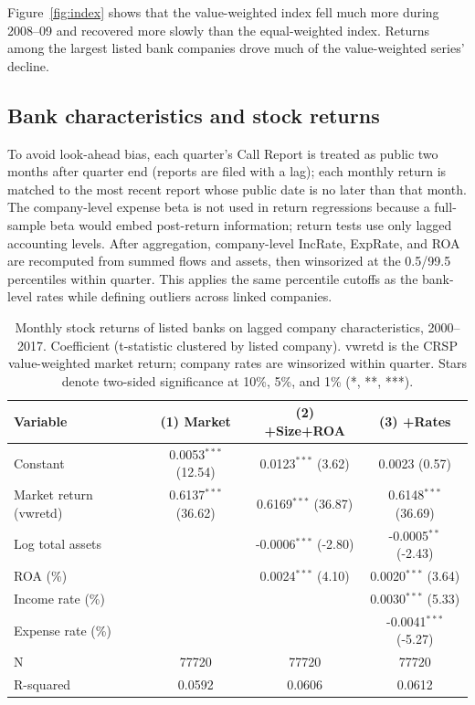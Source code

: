 \documentclass[11pt]{article}
\begin{document}
Figure~\ref{fig:index} shows that the value-weighted index fell much more
during 2008--09 and recovered more slowly than the equal-weighted index.
Returns among the largest listed bank companies drove much of the
value-weighted series' decline.

\subsection{Bank characteristics and stock returns}
To avoid look-ahead bias, each quarter's Call Report is treated as public two
months after quarter end (reports are filed with a lag); each monthly return
is matched to the most recent report whose public date is no later than that
month. The company-level expense beta is not used in return regressions
because a full-sample beta would embed post-return information; return tests
use only lagged accounting levels. After aggregation, company-level IncRate,
ExpRate, and ROA are recomputed from summed flows and assets, then winsorized
at the 0.5/99.5 percentiles within quarter. This applies the same percentile
cutoffs as the bank-level rates while defining outliers across linked
companies.

\begin{table}[H]\centering\small
\caption{Monthly stock returns of listed banks on lagged company
characteristics, 2000--2017. Coefficient (t-statistic clustered by listed
company). vwretd is the CRSP value-weighted market return; company rates are
winsorized within quarter. Stars denote two-sided significance at 10\%, 5\%,
and 1\% (*, **, ***).}\label{tab:t4}
\begin{tabular}{lccc}\toprule
Variable & (1) Market & (2) +Size+ROA & (3) +Rates\\
\midrule
Constant & 0.0053$^{***}$ (12.54) & 0.0123$^{***}$ (3.62) & 0.0023 (0.57)\\
Market return (vwretd) & 0.6137$^{***}$ (36.62) & 0.6169$^{***}$ (36.87) & 0.6148$^{***}$ (36.69)\\
Log total assets &  & -0.0006$^{***}$ (-2.80) & -0.0005$^{**}$ (-2.43)\\
ROA (\%) &  & 0.0024$^{***}$ (4.10) & 0.0020$^{***}$ (3.64)\\
Income rate (\%) &  &  & 0.0030$^{***}$ (5.33)\\
Expense rate (\%) &  &  & -0.0041$^{***}$ (-5.27)\\
N & 77720 & 77720 & 77720\\
R-squared & 0.0592 & 0.0606 & 0.0612\\
\bottomrule
\end{tabular}
\end{table}
\end{document}
